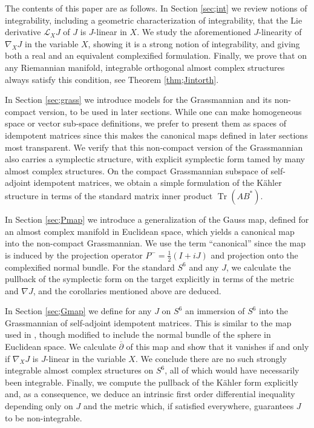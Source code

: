 \documentclass[pdftex]{sigma}
\DeclareMathOperator{\Tr}{Tr}
\numberwithin{equation}{section}
\begin{document}
The contents of this paper are as follows. In Section \ref{sec;int} we review notions of integrability, including a geometric characterization of integrability, that the Lie derivative $\mathcal{L}_X J$ of $J$ is $J$-linear in $X$. We study the aforementioned $J$-linearity of $\nabla_X J$ in the variable $X$, showing it is a strong notion of integrability, and giving both a real and an equivalent complexified formulation. Finally, we prove that on any Riemannian manifold, integrable orthogonal almost complex structures always satisfy this condition,
see Theorem \ref{thm;Jintorth}.

In Section \ref{sec;grass} we introduce models for the Grassmannian and its non-compact version, to be used in later sections. While one can make homogeneous space or vector sub-space definitions, we prefer to present them as spaces of idempotent matrices since this makes the canonical maps defined in later sections most transparent. We verify that this non-compact version of the Grassmannian also carries a symplectic structure, with explicit symplectic form tamed by many almost complex structures. On the compact Grassmannian subspace of self-adjoint idempotent matrices, we obtain a simple formulation of the K\"ahler structure in terms of the standard matrix inner product $\Tr (AB^*)$.

In Section \ref{sec;Pmap} we introduce a generalization of the Gauss map, defined for an almost complex manifold in Euclidean space, which yields a canonical map into the non-compact Grassmannian. We use the term ``canonical'' since the map is induced by the projection operator $P^- = \frac 1 2 (I + i J)$ and projection onto the complexified normal bundle. For the standard $S^6$ and any $J$, we calculate the pullback of the symplectic form on the target explicitly in terms of the metric and $\nabla J$, and the corollaries mentioned above are deduced.

In Section \ref{sec;Gmap} we define for any $J$ on $S^6$ an immersion of $S^6$ into the Grassmannian of self-adjoint idempotent matrices. This is similar to the map used in \cite{L}, though modified to include the normal bundle of the sphere in Euclidean space. We calculate $\overline{\partial}$ of this map and show that it vanishes if and only if $\nabla_X J$ is $J$-linear in the variable $X$. We conclude there are no such strongly integrable almost complex structures on $S^6$, all of which would have necessarily been integrable.
Finally, we compute the pullback of the K\"ahler form explicitly and, as a consequence, we deduce an intrinsic first order differential inequality depending only on $J$ and the metric which, if satisfied everywhere, guarantees $J$ to be non-integrable.
\end{document}
